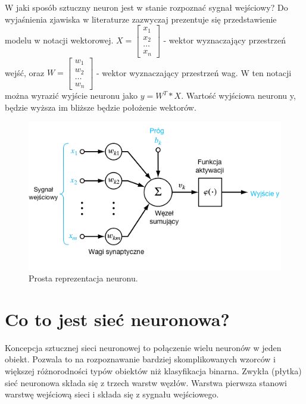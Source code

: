 \documentclass[12pt,a4paper,twoside,titlepage,openright]{book}
\begin{document}
W jaki sposób sztuczny neuron jest w stanie rozpoznać sygnał wejściowy? Do wyjaśnienia zjawiska w literaturze zazwyczaj prezentuje się przedstawienie modelu w notacji wektorowej.
\newline
\(X = \begin{bmatrix} x_{1} \\ x_{2} \\ \dots \\ x_{n} \end{bmatrix} \) - wektor wyznaczający przestrzeń wejść, oraz \newline
\(W = \begin{bmatrix} w_{1} \\ w_{2} \\ \dots \\ w_{n} \end{bmatrix} \) - wektor wyznaczający przestrzeń wag. \newline W ten notacji można wyrazić wyjście neuronu jako \(y= W^T * X\). Wartość wyjściowa neuronu y, będzie wyższa im bliższe będzie położenie wektorów. \cite{sieciNeuronowe}

\begin{figure}[ht]
	\centering
			\includegraphics[resolution=100, scale=0.7]{Neuron.png}
		\caption{Prosta reprezentacja neuronu.}
\end{figure}

\section{Co to jest sieć neuronowa?}
Koncepcja sztucznej sieci neuronowej to połączenie wielu neuronów w jeden obiekt. Pozwala to na rozpoznawanie bardziej skomplikowanych wzorców i większej różnorodności typów obiektów niż klasyfikacja binarna. Zwykła (płytka) sieć neuronowa składa się z trzech warstw węzłów. Warstwa pierwsza stanowi warstwę wejściową sieci i składa się z sygnału wejściowego.
\end{document}
